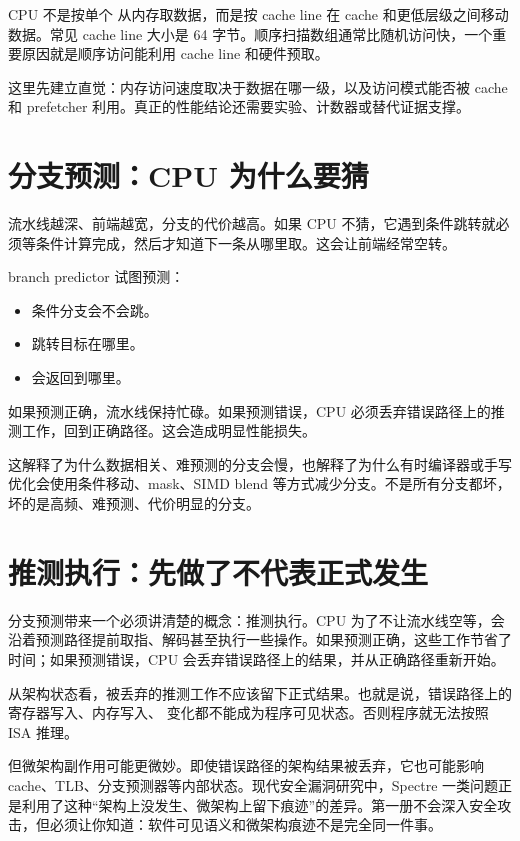 CPU 不是按单个  从内存取数据，而是按 cache line 在 cache 和更低层级之间移动数据。常见 cache line 大小是 64 字节。顺序扫描数组通常比随机访问快，一个重要原因就是顺序访问能利用 cache line 和硬件预取。

这里先建立直觉：内存访问速度取决于数据在哪一级，以及访问模式能否被 cache 和 prefetcher 利用。真正的性能结论还需要实验、计数器或替代证据支撑。

\section{分支预测：CPU 为什么要猜}

流水线越深、前端越宽，分支的代价越高。如果 CPU 不猜，它遇到条件跳转就必须等条件计算完成，然后才知道下一条从哪里取。这会让前端经常空转。

branch predictor 试图预测：

\begin{itemize}
  \item 条件分支会不会跳。
  \item 跳转目标在哪里。
  \item {} 会返回到哪里。
\end{itemize}

如果预测正确，流水线保持忙碌。如果预测错误，CPU 必须丢弃错误路径上的推测工作，回到正确路径。这会造成明显性能损失。

这解释了为什么数据相关、难预测的分支会慢，也解释了为什么有时编译器或手写优化会使用条件移动、mask、SIMD blend 等方式减少分支。不是所有分支都坏，坏的是高频、难预测、代价明显的分支。

\section{推测执行：先做了不代表正式发生}

分支预测带来一个必须讲清楚的概念：推测执行。CPU 为了不让流水线空等，会沿着预测路径提前取指、解码甚至执行一些操作。如果预测正确，这些工作节省了时间；如果预测错误，CPU 会丢弃错误路径上的结果，并从正确路径重新开始。

从架构状态看，被丢弃的推测工作不应该留下正式结果。也就是说，错误路径上的寄存器写入、内存写入、 变化都不能成为程序可见状态。否则程序就无法按照 ISA 推理。

但微架构副作用可能更微妙。即使错误路径的架构结果被丢弃，它也可能影响 cache、TLB、分支预测器等内部状态。现代安全漏洞研究中，Spectre 一类问题正是利用了这种“架构上没发生、微架构上留下痕迹”的差异。第一册不会深入安全攻击，但必须让你知道：软件可见语义和微架构痕迹不是完全同一件事。

